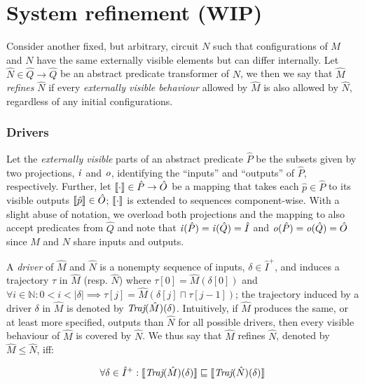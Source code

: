 \section{System refinement (WIP)}

Consider another fixed, but arbitrary, circuit $N$ such that configurations of $M$ and $N$ have the same externally visible elements but can differ internally. Let $\hat N \in \hat Q \rightarrow \hat Q$ be an abstract predicate transformer of $N$, we then we say that $\hat M$ \textit{refines} $\hat N$ if every \textit{externally visible behaviour} allowed by $\hat M$ is also allowed by $\hat N$, regardless of any initial configurations.


\subsubsection{Drivers} Let the \textit{externally visible} parts of an abstract predicate $\hat P$ be the subsets given by two projections, $\operatorname{\mathit{i}}$ and $\mathit{o}$, identifying the ``inputs'' and ``outputs'' of $\hat P$, respectively. Further, let $\llbracket\cdot\rrbracket \in \hat P \rightarrow \hat O$ be a mapping that takes each $\hat p \in \hat P$ to its visible outputs $\llbracket\hat p\rrbracket \in \hat O$; $\llbracket\cdot\rrbracket$ is extended to sequences component-wise. With a slight abuse of notation, we overload both projections and the mapping to also accept predicates from $\hat Q$ and note that $\operatorname{\mathit{i}}(\hat P) = \operatorname{\mathit{i}}(\hat Q) = \hat I$ and $\mathit{o}(\hat P) = \mathit{o}(\hat Q) = \hat O$ since $M$ and $N$ share inputs and outputs.

A \textit{driver} of $\hat M$ and $\hat N$ is a nonempty sequence of inputs, $\delta \in \hat I^{+}$, and induces a trajectory $\tau$ in $\hat M$ (resp. $\hat N$) where $\tau[0] = \hat M(\delta[0])$ and $\forall i \in \mathbb{N} : 0 < i < | \delta | \implies \tau[j] = \hat M(\delta[j] \sqcap \tau[j-1])$; the trajectory induced by a driver $\delta$ in $\hat M$ is denoted by $\operatorname{\textit{Traj}}(\hat M)(\delta)$. Intuitively, if $\hat M$ produces the same, or at least more specified, outputs than $\hat N$ for all possible drivers, then every visible behaviour of $\hat M$ is covered by $\hat N$. We thus say that $\hat M$ refines $\hat N$, denoted by $\hat M \leq \hat N$, iff:

\begin{equation*}
\forall \delta \in \hat I^{+} : \llbracket\operatorname{\textit{Traj}}(\hat M)(\delta)\rrbracket \sqsubseteq \llbracket\operatorname{\textit{Traj}}(\hat N)(\delta)\rrbracket
\end{equation*}

